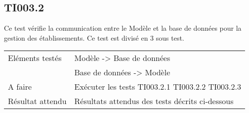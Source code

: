 \subsection{TI003.2}
  		Ce test vérifie la communication entre le Modèle et la base de données pour la gestion des établissements. Ce test est divisé en 3 sous test.
  	
 
 	 \begin{center}
    	 	\begin{tabular}[h]{|p{}|p{}|}
		\hline
			Eléments testés & Modèle -> Base de données  \\
						    &  Base de données -> Modèle \\\hline
    			A faire & Exécuter les tests TI003.2.1 TI003.2.2 TI003.2.3 \\\hline
    			Résultat attendu & Résultats attendus des tests décrits ci-dessous \\\hline
     	\end{tabular}
  	\end{center}	
  	

  		




  		
  		

